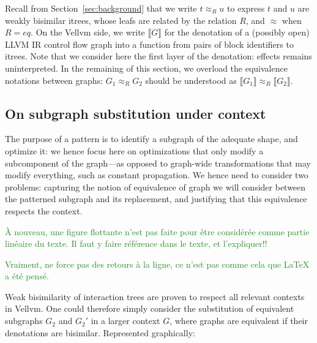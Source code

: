 \documentclass[11pt]{article}
\newcommand{\yz}[1]{\textcolor{ForestGreen}{#1}}
\newcommand{\yzt}[1]{\textcolor{ForestGreen!50}{#1}}
\begin{document}
Recall from Section~\ref{sec:background} that we write $t \approx_R u$ to express $t$ and $u$ are weakly bisimilar itrees, whose leafs are related by the relation $R$, and $\approx$ when $R=eq$. On the Vellvm side, we write $\llbracket G \rrbracket$ for the denotation of a (possibly open) LLVM IR control flow graph into a function from pairs of block identifiers to itrees. Note that we consider here the first layer of the denotation: effects remains uninterpreted.
In the remaining of this section, we overload the equivalence notations between graphs: $G_1 \approx_R G_2$ should be understood as $\llbracket G_1\rrbracket \approx_R \llbracket G_2\rrbracket$.

\subsection{On subgraph substitution under context}

The purpose of a pattern is to identify a subgraph of the adequate shape, and optimize it: we hence focus here on optimizations that only modify a subcomponent of the graph---as opposed to graph-wide transformations that may modify everything, such as constant propagation. We hence need to consider two problems: capturing the notion of equivalence of graph we will consider between the patterned subgraph and its replacement, and justifying that this equivalence respects the context.

\yz{À nouveau, une figure flottante n'est pas faite pour être considérée comme partie linéaire du texte. Il faut y faire référence dans le texte, et l'expliquer!!}

\yz{Vraiment, ne force pas des retours à la ligne, ce n'est pas comme cela que LaTeX a été pensé.}


\yzt{Weak bisimilarity of interaction trees are proven to respect all relevant contexts in Vellvm. One could therefore simply consider the substitution of equivalent subgraphs $G_2$ and $G_2'$ in a larger context $G$, where graphs are equivalent if their denotations are bisimilar. Represented graphically:}
\end{document}
